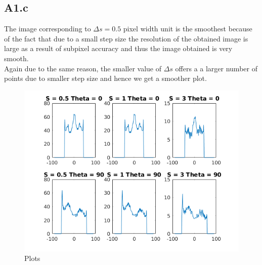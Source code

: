 \documentclass{article}
\begin{document}

\subsection*{A1.c}

The image corresponding to $ \Delta s = 0.5 $ pixel width unit is the smoothest because of the fact that due to a small step size the resolution of the obtained image is large as a result of subpixel accuracy and thus the image obtained is very smooth. \\
Again due to the same reason, the smaller value of $ \Delta s$ offers a a larger number of points due to smaller step size and hence we get a smoother plot.


\begin{figure}[h]
	\centering
	\includegraphics[scale = 0.7]{code/html/myRadonTrans_04.png}
	\caption{Plots}
	\label{Fig :1b}
\end{figure}

\end{document}
